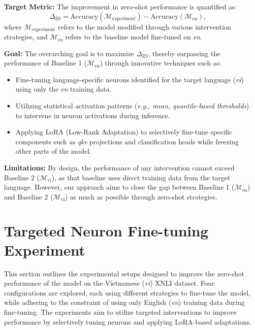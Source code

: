 \textbf{Target Metric:} The improvement in zero-shot performance is quantified as:
\begin{equation}
	\Delta_\text{ZS} = \text{Accuracy}(\mathcal{M}_\text{experiment}) - \text{Accuracy}(\mathcal{M}_\text{en}),
\end{equation}
where \(\mathcal{M}_\text{experiment}\) refers to the model modified through various intervention strategies, and \(\mathcal{M}_\text{en}\) refers to the baseline model fine-tuned on \textit{en}.

\textbf{Goal:} The overarching goal is to maximize \(\Delta_\text{ZS}\), thereby surpassing the performance of Baseline 1 (\(\mathcal{M}_\text{en}\)) through innovative techniques such as:
\begin{itemize}
	\item Fine-tuning language-specific neurons identified for the target language (\textit{vi}) using only the \textit{en} training data.
	\item Utilizing statistical activation patterns (\textit{e.g., mean, quantile-based thresholds}) to intervene in neuron activations during inference.
	\item Applying LoRA (Low-Rank Adaptation) to selectively fine-tune specific components such as \textit{qkv} projections and classification heads while freezing other parts of the model.
\end{itemize}

\textbf{Limitations:} By design, the performance of any intervention cannot exceed Baseline 2 (\(\mathcal{M}_\text{vi}\)), as that baseline uses direct training data from the target language. However, our approach aims to close the gap between Baseline 1 (\(\mathcal{M}_\text{en}\)) and Baseline 2 (\(\mathcal{M}_\text{vi}\)) as much as possible through zero-shot strategies.

\section{Targeted Neuron Fine-tuning Experiment}

This section outlines the experimental setups designed to improve the zero-shot performance of the model on the Vietnamese (\textit{vi}) XNLI dataset. Four configurations are explored, each using different strategies to fine-tune the model, while adhering to the constraint of using only English (\textit{en}) training data during fine-tuning. The experiments aim to utilize targeted interventions to improve performance by selectively tuning neurons and applying LoRA-based adaptations.

